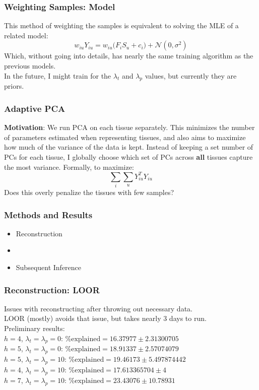 \documentclass{beamer}
\newcommand{\ind}[0]{\indent}
\newcommand{\tx}[1]{\text{#1}}
\begin{document}
\begin{frame} \frametitle{Weighting Samples: Model}
This method of weighting the samples is equivalent to solving the MLE of a related model:
\[ w_{iu} Y_{iu} = w_{iu}\big(F_i S_u + c_i\big) + \mathcal{N}(0, \sigma^2) \]
Which, without going into details, has nearly the same training algorithm as the previous models. \\
In the future, I might train for the $\lambda_t$ and $\lambda_p$ values, but currently they are priors.
\end{frame}

\begin{frame} \frametitle{Adaptive PCA}
{\bf Motivation}: We run PCA on each tissue separately. This minimizes the number of parameters estimated when representing tissues, and also aims to maximize how much of the variance of the data is kept. Instead of keeping a set number of PCs for each tissue, I globally choose which set of PCs across {\bf all} tissues capture the most variance. Formally, to maximize:
\[ \sum_{i}\sum_{u} Y_{iu}^TY_{iu} \]
Does this overly penalize the tissues with few samples?
\end{frame}

\begin{frame} \frametitle{Methods and Results}
\begin{itemize}
	\item Reconstruction
	\item
	\item Subsequent Inference
\end{itemize}
\end{frame}

\begin{frame} \frametitle{Reconstruction: LOOR}
Issues with reconstructing after throwing out necessary data. \\
LOOR (mostly) avoids that issue, but takes nearly 3 days to run. \\
Preliminary results: \\
\ind $h=4$, $\lambda_t = \lambda_p = 0$: $\%\tx{explained} = 16.37977 \pm 2.31300705$ \\
\ind $h=5$, $\lambda_t = \lambda_p = 0$: $\%\tx{explained} = 18.91337 \pm 2.57074079$ \\
\ind $h=5$, $\lambda_t = \lambda_p = 10$: $\%\tx{explained} = 19.46173 \pm 5.497874442$ \\
\ind $h=4$, $\lambda_t = \lambda_p = 10$: $\%\tx{explained} = 17.613365704  \pm 4$ \\
\ind $h=7$, $\lambda_t = \lambda_p = 10$: $\%\tx{explained} = 23.43076 \pm 10.78931$ \\ 
\end{frame}
\end{document}
